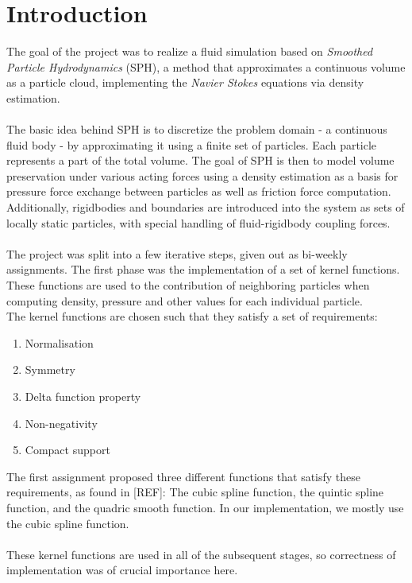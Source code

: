 \documentclass{ACGSeminar}
\begin{document}
\section{Introduction}
The goal of the project was to realize a fluid simulation based on \textit{Smoothed Particle Hydrodynamics} (SPH), a method that approximates a continuous volume as a particle cloud, implementing the \textit{Navier Stokes} equations via density estimation.\\
\\
The basic idea behind SPH is to discretize the problem domain - a continuous fluid body - by approximating it using a finite set of particles. Each particle represents a part of the total volume. The goal of SPH is then to model volume preservation under various acting forces using a density estimation as a basis for pressure force exchange between particles as well as friction force computation. Additionally, rigidbodies and boundaries are introduced into the system as sets of locally static particles, with special handling of fluid-rigidbody coupling forces. \\
\\
The project was split into a few iterative steps, given out as bi-weekly assignments.
The first phase was the implementation of a set of kernel functions. These functions are used to the contribution of neighboring particles when computing density, pressure and other values for each individual particle. \\
The kernel functions are chosen such that they satisfy a set of requirements:\\
\begin{enumerate}
\item Normalisation 
\item Symmetry 
\item Delta function property 
\item Non-negativity 
\item Compact support
\end{enumerate}
The first assignment proposed three different functions that satisfy these requirements, as found in [REF]: The cubic spline function, the quintic spline function, and the quadric smooth function.
In our implementation, we mostly use the cubic spline function.\\
\\
These kernel functions are used in all of the subsequent stages, so correctness of implementation was of crucial importance here.\\
\\
\end{document}
